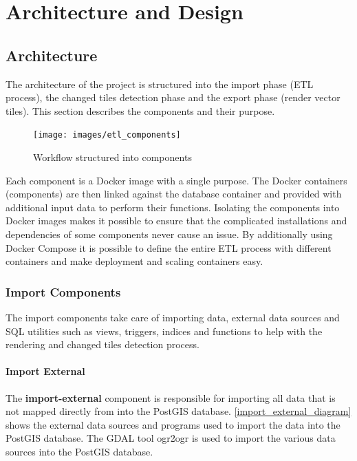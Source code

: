 \chapter{Architecture and Design}\label{design}

\section{Architecture}

The architecture of the project is structured into the import phase (ETL process), the changed tiles detection phase  and the export phase (render vector tiles). This section describes the components and their purpose.

\begin{figure}[H]
  \centering
  \texttt{[image: images/etl\_components]}
  \caption{Workflow structured into components}
\end{figure}

Each component is a Docker image\cite{docker} with a single purpose. The Docker containers (components) are then linked against the database container and provided with additional input data to perform their functions. Isolating the components into Docker images makes it possible to ensure that the complicated installations and dependencies of some components never cause an issue. By additionally using Docker Compose it is possible to define the entire ETL process with different containers and make deployment and scaling containers easy.

\subsection{Import Components}

The import components take care of importing \osm{} data, external data sources and SQL utilities such as views, triggers, indices and functions to help with the rendering and changed tiles detection process.

\subsubsection{Import External}

The \textbf{import-external} component is responsible for importing all data that is not mapped directly from \osm{} into the PostGIS database. \autoref{import_external_diagram} shows the external data sources and programs used to import the data into the PostGIS database. The GDAL tool ogr2ogr is used to import the various data sources into the PostGIS database.

